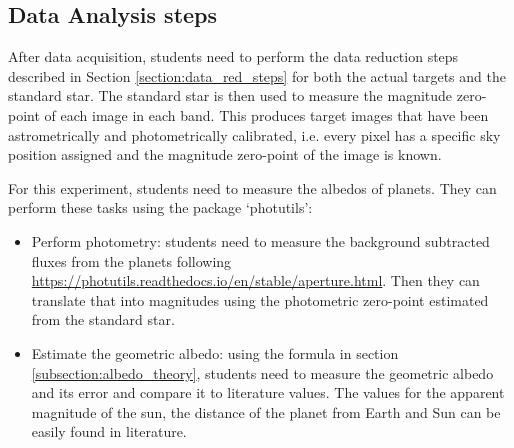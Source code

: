 \documentclass[a4paper, 11pt, fleqn]{memoir}
\begin{document}
\subsection{Data Analysis steps}

After data acquisition, students need to perform the data reduction steps described in Section \ref{section:data_red_steps} for both the actual targets and the standard star.
The standard star is then used to measure the magnitude zero-point of each image in each band.
This produces target images that have been astrometrically and photometrically calibrated, i.e. every pixel has a specific sky position assigned and the magnitude zero-point of the image is known.

For this experiment, students need to measure the albedos of planets.
They can perform these tasks using the  package `photutils':
\begin{itemize}
    \item Perform photometry: students need to measure the background subtracted fluxes from the planets following \url{https://photutils.readthedocs.io/en/stable/aperture.html}.
          Then they can translate that into magnitudes using the photometric zero-point estimated from the standard star.
    \item
          Estimate the geometric albedo: using the formula in section
          \ref{subsection:albedo_theory}, students need to measure the geometric albedo
          and its error and compare it to literature values.
          The values for the apparent magnitude of the sun, the distance of the planet from Earth and Sun can be easily found in literature.
\end{itemize}






\end{document}
